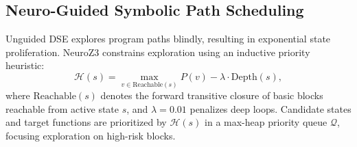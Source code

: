 \documentclass[10pt,conference]{IEEEtran}
\begin{document}
\subsection{Neuro-Guided Symbolic Path Scheduling}
Unguided DSE explores program paths blindly, resulting in exponential state proliferation. NeuroZ3 constrains exploration
using an inductive priority heuristic:
\begin{equation}
  \mathcal{H}(s) = \max_{v \in \text{Reachable}(s)} P(v) - \lambda \cdot \text{Depth}(s),
  \label{eq:heuristic}
\end{equation}
where $\text{Reachable}(s)$ denotes the forward transitive closure of basic blocks reachable from active state $s$, and
$\lambda = 0.01$ penalizes deep loops. Candidate states and target functions are prioritized by $\mathcal{H}(s)$ in a max-heap
priority queue $\mathcal{Q}$, focusing exploration on high-risk blocks.
\end{document}
